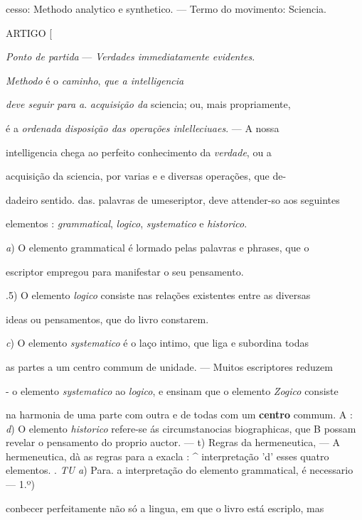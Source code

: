 cesso: Methodo analytico e synthetico. --- Termo do movimento: Sciencia.

ARTIGO [

\emph{Ponto de partida} --- \emph{Verdades immediatamente evidentes}.


       
\emph{Methodo} é o \emph{caminho}, \emph{que a intelligencia}

\emph{deve seguir para a}. \emph{acquisição da} sciencia; ou, mais propriamente,

é a \emph{ordenada disposição das operações inlelleciuaes}. --- A nossa

intelligencia chega ao perfeito conhecimento da \emph{verdade}, ou a

acquisição da sciencia, por varias e e diversas operações, que de-

dadeiro sentido. das. palavras de umeseriptor, deve attender-so aos seguintes

elementos : \emph{grammatical}, \emph{logico}, \emph{systematico} e \emph{historico}.

\emph{a}) O elemento grammatical é lormado pelas palavras e phrases, que o

escriptor empregou para manifestar o seu pensamento.

.5) O elemento \emph{logico} consiste nas relações existentes entre as diversas

ideas ou pensamentos, que do livro constarem.

\emph{c}) O elemento \emph{systematico} é o laço intimo, que liga e subordina todas

as partes a um centro commum de unidade. --- Muitos escriptores reduzem

- o elemento \emph{systematico} ao \emph{logico}, e ensinam que o elemento \emph{Zogico} consiste

na harmonia de uma parte com outra e de todas com um \textbf{centro} commum. A : \emph{d}) O elemento \emph{historico} refere-se ás circumstanocias biographicas, que B possam revelar o pensamento do proprio auctor. --- t) Regras da hermeneutica, --- A hermeneutica, dà as regras para a exacla : \textasciicircum{} interpretação 'd' esses quatro elementos. . \emph{TU a}) Para. a interpretação do elemento grammatical, é necessario --- 1.º)

conbecer perfeitamente não só a lingua, em que o livro está escriplo, mas

